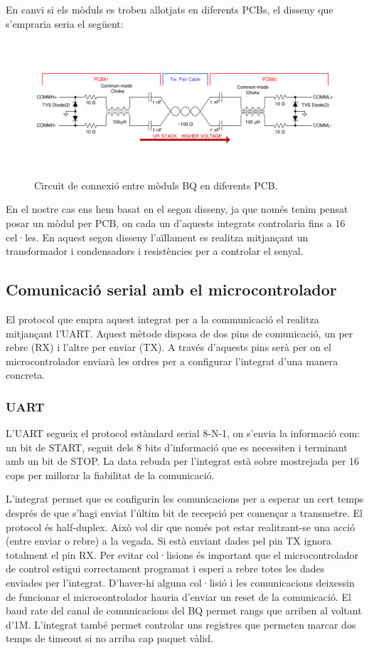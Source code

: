 En canvi si els mòduls es troben allotjats en diferents PCBs, el disseny que s'empraria seria el següent:

\begin{figure}[H]
	\centering
    \includegraphics[width=12cm, height=5cm] {Prototip/esquemadifpcb.png}
    \caption{Circuit de connexió entre mòduls BQ en diferents PCB.}
\end{figure}

En el nostre cas ens hem basat en el segon disseny, ja que només tenim pensat posar un mòdul per PCB, on cada un d'aquests integrats controlaria fins a 16 cel·les. En aquest segon disseny l'aïllament es  realitza mitjançant un transformador i condensadors i resistències per a controlar el senyal.

\subsection{Comunicació serial amb el microcontrolador}

El protocol que empra aquest integrat per a la communicació el realitza mitjançant l'UART. Aquest mètode disposa de dos pins de comunicació, un per rebre (RX) i l'altre per enviar (TX). A través d'aquests pins serà per on el microcontrolador enviarà les ordres per a configurar l'integrat d'una manera concreta. 

\subsubsection{UART}
L'UART segueix el protocol estàndard serial 8-N-1, on s'envia la informació com: un bit de START, seguit dels 8 bits d'informació que es necessiten i terminant amb un bit de STOP. La data rebuda per l'integrat està sobre mostrejada per 16 cops per millorar la fiabilitat de la comunicació.

L'integrat permet que es configurin les comunicacions per a esperar un cert temps després de que s'hagi enviat l'últim bit de recepció per començar a transmetre. El protocol és half-duplex. Això vol dir que només pot estar realitzant-se una acció (entre enviar o rebre) a la vegada. Si està enviant dades pel pin TX ignora totalment el pin RX. Per evitar col·lisions és important que el microcontrolador de control estigui correctament programat i esperi a rebre totes les dades enviades per l'integrat. D'haver-hi alguna col·lisió i les comunicacions deixessin de funcionar el microcontrolador hauria d'enviar un reset de la comunicació. El baud rate del canal de comunicacions del BQ permet rangs que arriben al voltant d'1M. L'integrat també permet controlar uns registres que permeten marcar dos temps de timeout si no arriba cap paquet vàlid.  

